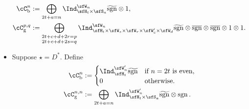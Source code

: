 \documentclass[12pt,a4paper]{amsart}
\newcommand{\Res}{\mathrm{Res}}
\newcommand{\sgn}{\operatorname{sgn}}
\numberwithin{equation}{section}
\theoremstyle{remark}
\def\Cint#1{\Coh_{[#1]}}
\def\bsgn{\overline{\sgn}}
\def\Coh{\mathrm{Coh}}
\def\hsgn{\widetilde{\mathrm{sgn}}}
\begin{document}
\begin{itemize}
        \[
        \begin{split}
          \cC_{\mathrm b}^{n} & := \bigoplus_{\substack{2t+a=n}}
          \Ind_{\sfH_{t}\times \sfS_{a}}^{\sfW_{n}} \hsgn\otimes 1,\\
          \cC_{\mathrm g}^{p,q} %
          & := \bigoplus_{\substack{2t+c+d+2r=p\\2t+c+d+2s=q}}
          \Ind_{\sfH_{t} \times \sfW_s\times \sfW_r\times \sfW'_{c}\times \sfW_{d} }^{\sfW_{n}} \hsgn \otimes \bsgn \otimes \bsgn \otimes 1\otimes
          1. %
          \\
        \end{split}
        \]
  \item Suppose $\star=D^{*}$. Define
        \[
        \begin{split}
          \cC_{\mathrm b}^{n} & :=
          \begin{cases}
            \Ind_{\sfH_{t}}^{\sfW'_{n}} \hsgn &
            \text{if $n=2t$ is even}, \\
            0 & \text{otherwise}.\\
          \end{cases}\\
          \cC_{\mathrm g}^{n,n} %
          &:=\bigoplus_{\substack{2t+a=n}} \Ind_{\sfH_{t} \times \sfS_{a}}^{\sfW'_{n}}
          \hsgn \otimes \sgn. \\
        \end{split}
        \]
\end{itemize}
\end{document}
